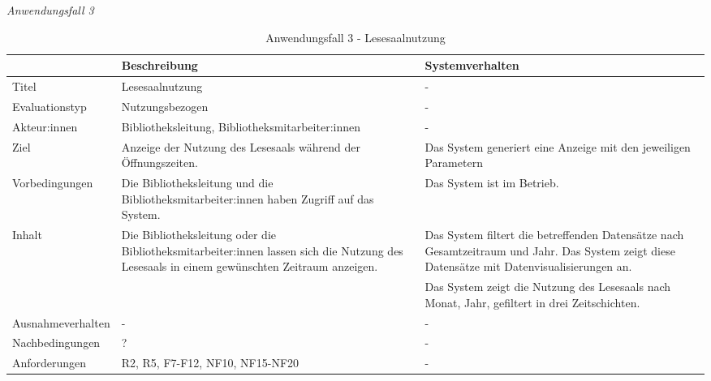 \endgroup

\newpage
\noindent
\textit{Anwendungsfall 3}

\begingroup
\setlength{\tabcolsep}{10pt} %
\renewcommand{\arraystretch}{1.25} 
\begin{table}[h]
    \centering
    \begin{adjustbox}{max width=\textwidth}
    \begin{tabular}{lp{7.0cm}p{7.0cm}}
       \toprule
       \textbf{}          & \textbf{Beschreibung} &\textbf{Systemverhalten}\\
       \midrule
        Titel                            &Lesesaalnutzung& -\\
        Evaluationstyp                   &Nutzungsbezogen                   & -\\
        Akteur:innen                     &Bibliotheksleitung, Bibliotheksmitarbeiter:innen& -\\
        Ziel                             &Anzeige der Nutzung des Lesesaals während der Öffnungszeiten.& Das System generiert eine Anzeige mit den jeweiligen Parametern\\
        Vorbedingungen                   &Die Bibliotheksleitung und die Bibliotheksmitarbeiter:innen haben Zugriff auf das System.& Das System ist im Betrieb.\\
        Inhalt                          &Die Bibliotheksleitung oder die Bibliotheksmitarbeiter:innen lassen sich die Nutzung des Lesesaals in einem gewünschten Zeitraum anzeigen. & Das System filtert die betreffenden Datensätze nach Gesamtzeitraum und Jahr. Das System zeigt diese Datensätze mit Datenvisualisierungen an.\\
                                         & &Das System zeigt die Nutzung des Lesesaals nach Monat, Jahr, gefiltert in drei Zeitschichten.\\
        Ausnahmeverhalten               &- & -\\
        Nachbedingungen                 &?& -\\

        Anforderungen                   &R2, R5, F7-F12, NF10, NF15-NF20& -\\
        \bottomrule
    \end{tabular}
    \end{adjustbox}
    \caption{%
    Anwendungsfall 3 - Lesesaalnutzung    }
    \label{tab:AF_Lesesaalnutzung}
    \end{table}
\endgroup



